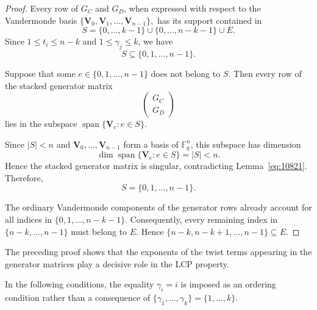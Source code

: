 \documentclass[12pt,draftcls,journal,onecolumn]{IEEEtran}
\begin{document}
\begin{proof}
Every row of \(G_C\) and \(G_D\), when expressed with respect to the
Vandermonde basis
\(
\{\mathbf{V}_0,\mathbf{V}_1,\ldots,\mathbf{V}_{n-1}\},
\)
has its support contained in
\[
S=\{0,\ldots,k-1\}
\cup\{0,\ldots,n-k-1\}
\cup E.
\]
Since \(1\le t_i\le n-k\) and \(1\le\gamma_j\le k\), we have
\[
S\subseteq\{0,1,\ldots,n-1\}.
\]

Suppose that some \(e\in\{0,1,\ldots,n-1\}\) does not belong to \(S\).
Then every row of the stacked generator matrix
\[
\begin{pmatrix}
G_C\\
G_D
\end{pmatrix}
\]
lies in the subspace
\(
\operatorname{span}\{\mathbf{V}_e:e\in S\}.
\)

Since \(|S|<n\) and
\(\mathbf{V}_0,\ldots,\mathbf{V}_{n-1}\) form a basis of
\(\mathbb{F}_q^n\), this subspace has dimension
\[
\dim\operatorname{span}\{\mathbf{V}_e:e\in S\}
=|S|<n.
\]
Hence the stacked generator matrix is singular, contradicting
Lemma~\ref{eq:10821}. Therefore,
\[
S=\{0,1,\ldots,n-1\}.
\]

The ordinary Vandermonde components of the generator rows already
account for all indices in
\(
\{0,1,\ldots,n-k-1\}.
\)
Consequently, every remaining index in
\(\{n-k,\ldots,n-1\}\) must belong to \(E\). Hence
\(
\{n-k,n-k+1,\ldots,n-1\}\subseteq E.
\)
\end{proof}

The preceding proof shows that the exponents of the twist terms appearing in the generator matrices play a decisive role in the LCP property.

In the following conditions, the equality $\gamma_i=i$
is imposed as an ordering condition rather than a consequence of
$\{\gamma_1,\ldots,\gamma_k\}=\{1,\ldots,k\}$.
\end{document}
